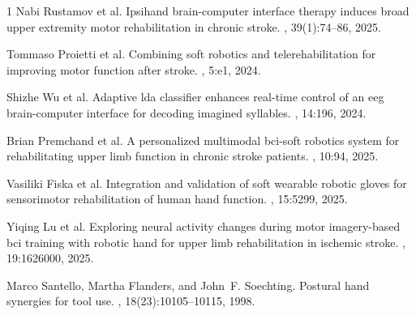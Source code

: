 \documentclass[11pt,a4paper]{article}
\begin{document}
\begin{thebibliography}{1}
Nabi Rustamov et al.
\newblock Ipsihand brain-computer interface therapy induces broad upper extremity motor rehabilitation in chronic stroke.
, 39(1):74--86, 2025.

Tommaso Proietti et al.
\newblock Combining soft robotics and telerehabilitation for improving motor function after stroke.
, 5:e1, 2024.

Shizhe Wu et al.
\newblock Adaptive lda classifier enhances real-time control of an eeg brain-computer interface for decoding imagined syllables.
, 14:196, 2024.

Brian Premchand et al.
\newblock A personalized multimodal bci-soft robotics system for rehabilitating upper limb function in chronic stroke patients.
, 10:94, 2025.

Vasiliki Fiska et al.
\newblock Integration and validation of soft wearable robotic gloves for sensorimotor rehabilitation of human hand function.
, 15:5299, 2025.

Yiqing Lu et al.
\newblock Exploring neural activity changes during motor imagery-based bci training with robotic hand for upper limb rehabilitation in ischemic stroke.
, 19:1626000, 2025.

Marco Santello, Martha Flanders, and John~F. Soechting.
\newblock Postural hand synergies for tool use.
, 18(23):10105--10115, 1998.

\end{thebibliography}
\end{document}
